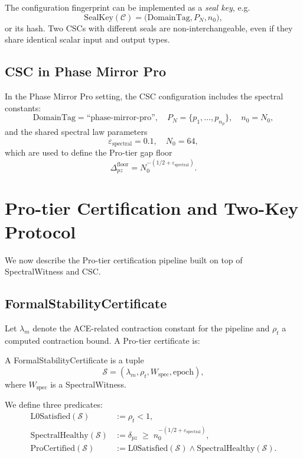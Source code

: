 \documentclass[11pt]{article}
\begin{document}
The configuration fingerprint can be implemented as a \emph{seal key},
e.g.
\[
  \mathrm{SealKey}(\mathcal{C})
  = \bigl(\mathrm{DomainTag}, P_N, n_0\bigr),
\]
or its hash. Two CSCs with different seals are non-interchangeable, even
if they share identical scalar input and output types.

\subsection{CSC in Phase Mirror Pro}

In the Phase Mirror Pro setting, the CSC configuration includes the
spectral constants:
\[
  \mathrm{DomainTag} = \text{``phase-mirror-pro''},\quad
  P_N = \{p_1,\dots,p_{n_p}\},\quad
  n_0 = N_0,
\]
and the shared spectral law parameters
\[
  \varepsilon_{\mathrm{spectral}} = 0.1,\quad
  N_0 = 64,
\]
which are used to define the Pro-tier gap floor
\[
  \Delta_{pz}^{\mathrm{floor}} = N_0^{-(1/2 + \varepsilon_{\mathrm{spectral}})}.
\]

\section{Pro-tier Certification and Two-Key Protocol}

We now describe the Pro-tier certification pipeline built on top of
SpectralWitness and CSC.

\subsection{FormalStabilityCertificate}

Let $\lambda_m$ denote the ACE-related contraction constant for the
pipeline and $\rho_t$ a computed contraction bound. A Pro-tier certificate
is:

\begin{definition}[FormalStabilityCertificate]
A FormalStabilityCertificate is a tuple
\[
  \mathcal{S}
  = (\lambda_m, \rho_t, W_{\mathrm{spec}}, \mathrm{epoch}),
\]
where $W_{\mathrm{spec}}$ is a SpectralWitness.
\end{definition}

We define three predicates:
\begin{align*}
  \mathrm{L0Satisfied}(\mathcal{S})
  &:= \rho_t < 1,\\
  \mathrm{SpectralHealthy}(\mathcal{S})
  &:= \delta_{pz} \;\ge\; n_0^{-(1/2+\varepsilon_{\mathrm{spectral}})},\\
  \mathrm{ProCertified}(\mathcal{S})
  &:= \mathrm{L0Satisfied}(\mathcal{S})
      \wedge \mathrm{SpectralHealthy}(\mathcal{S}).
\end{align*}
\end{document}
